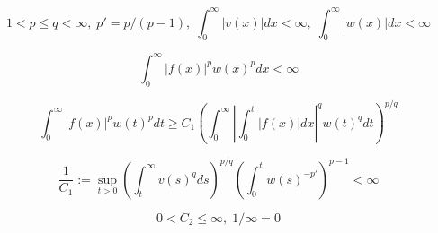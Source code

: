 $$
1<p\le q<\infty,\;p'=p/(p-1),\;\int^\infty_0|v(x)|dx<\infty,\;\int^\infty_0|w(x)|dx<\infty
$$

$$
\int^\infty_0|f(x)|^pw(x)^p dx<\infty
$$

$$
\int^\infty_0|f(x)|^p w(t)^p dt \ge C_1\left(\int^\infty_0\left|\int^t_0|f(x)|dx\right|^q w(t)^q dt\right)^{p/q}
$$

$$
\frac{1}{C_1}:=\sup_{t>0}\left(\int^\infty_t v(s)^q ds\right)^{p/q}\left(\int^t_0 w(s)^{-p'}\right)^{p-1}<\infty
$$

$$
0<C_2\le \infty,\; 1/\infty=0
$$

